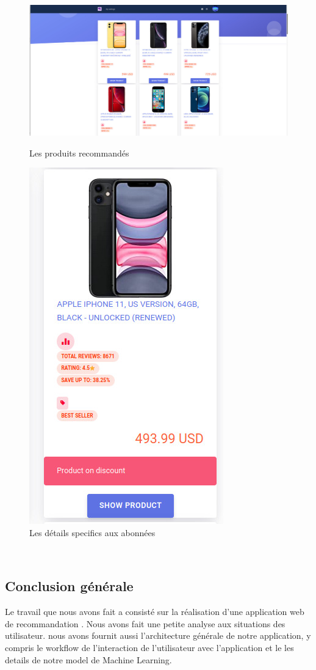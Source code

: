 \pagebreak
\begin{figure}[!T]
   \centering
\includegraphics[scale=.4]{pics/screens/3.png}
    \caption{Les produits recommandés}  
\includegraphics[scale=.4]{pics/screens/5.png}
    \caption{Les détails specifics aux abonnées}  
\end{figure}




\\


\newpage

\begin{center}
    \chapter*{Conclusion générale}
\end{center}
Le travail que nous avons fait a consisté sur la réalisation d'une application web de recommandation . Nous avons fait une petite analyse aux situations des utilisateur. nous avons fournit aussi l'architecture générale de notre application, y compris le workflow de l'interaction de l'utilisateur avec l'application et le les details de notre model de Machine Learning. \\

